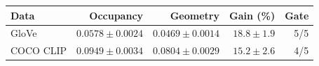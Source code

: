 \begin{tabular}{lrrrr}
\hline
Data & Occupancy & Geometry & Gain (\%) & Gate \\
\hline
GloVe & $0.0578\pm0.0024$ & $0.0469\pm0.0014$ & $18.8\pm1.9$ & 5/5 \\
COCO CLIP & $0.0949\pm0.0034$ & $0.0804\pm0.0029$ & $15.2\pm2.6$ & 4/5 \\
\hline
\end{tabular}
